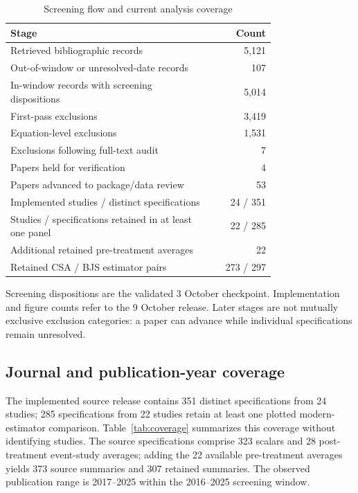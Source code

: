 \documentclass[11pt,letterpaper]{article}
\begin{document}
\begin{table}[ht]
\centering
\caption{Screening flow and current analysis coverage}
\label{tab:flow}
\begin{tabular}{p{0.76\linewidth}r}
\toprule
Stage & Count\\
\midrule
Retrieved bibliographic records & 5,121\\
Out-of-window or unresolved-date records & 107\\
In-window records with screening dispositions & 5,014\\
\quad First-pass exclusions & 3,419\\
\quad Equation-level exclusions & 1,531\\
\quad Exclusions following full-text audit & 7\\
\quad Papers held for verification & 4\\
\quad Papers advanced to package/data review & 53\\
\midrule
Implemented studies / distinct specifications & 24 / 351\\
Studies / specifications retained in at least one panel & 22 / 285\\
Additional retained pre-treatment averages & 22\\
Retained CSA / BJS estimator pairs & 273 / 297\\
\bottomrule
\end{tabular}
\par\vspace{0.35em}
\begin{minipage}{\linewidth}\footnotesize
Screening dispositions are the validated 3 October checkpoint. Implementation and figure counts refer to the 9 October release. Later stages are not mutually exclusive exclusion categories: a paper can advance while individual specifications remain unresolved.
\end{minipage}
\end{table}

\subsection{Journal and publication-year coverage}
The implemented source release contains 351 distinct specifications from 24 studies; 285 specifications from 22 studies retain at least one plotted modern-estimator comparison. Table~\ref{tab:coverage} summarizes this coverage without identifying studies. The source specifications comprise 323 scalars and 28 post-treatment event-study averages; adding the 22 available pre-treatment averages yields 373 source summaries and 307 retained summaries. The observed publication range is 2017--2025 within the 2016--2025 screening window.
\end{document}
